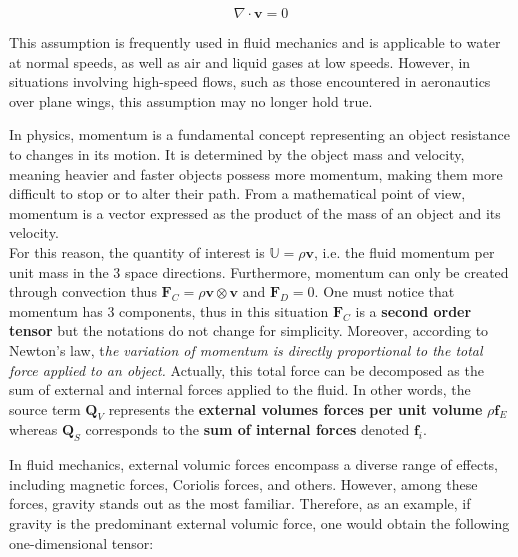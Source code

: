 \vspace{-0.1em}
\begin{equation}
	\nabla \cdot \mathbf{v}=0
	\label{C2 - EQ - Mass conservation law for incompressible fluid}
\end{equation}
\vspace{-0.8em}

This assumption is frequently used in fluid mechanics and is applicable to water at normal speeds, as well as air and liquid gases at low speeds. However, in situations involving high-speed flows, such as those encountered in aeronautics over plane wings, this assumption may no longer hold true.


In physics, momentum is a fundamental concept representing an object resistance to changes in its motion. It is determined by the object mass and velocity, meaning heavier and faster objects possess more momentum, making them more difficult to stop or to alter their path. From a mathematical point of view, momentum is a vector expressed as the product of the mass of an object and its velocity.\\

For this reason, the quantity of interest is $\boldsymbol{\mathbb{U}} = \rho \mathbf{v}$, i.e. the fluid momentum per unit mass in the 3 space directions. Furthermore, momentum can only be created through convection thus $\mathbf{F}_C = \rho \mathbf{v} \otimes \mathbf{v}$ and $\mathbf{F}_D = 0$. One must notice that momentum has 3 components, thus in this situation $\mathbf{F}_C$ is a \textbf{second order tensor} but the notations do not change for simplicity. Moreover, according to Newton's law, t\textit{he variation of momentum is directly proportional to the total force applied to an object.} Actually, this total force can be decomposed as the sum of external and internal forces applied to the fluid. In other words, the source term $\mathbf{Q}_V$ represents the \textbf{external volumes forces per unit volume }$\rho \mathbf{f}_E$ whereas $\mathbf{Q}_S$ corresponds to the \textbf{sum of internal forces} denoted $\mathbf{f}_i$.

\newpage

In fluid mechanics, external volumic forces encompass a diverse range of effects, including magnetic forces, Coriolis forces, and others. However, among these forces, gravity stands out as the most familiar. Therefore, as an example, if gravity is the predominant external volumic force, one would obtain the following one-dimensional tensor:


